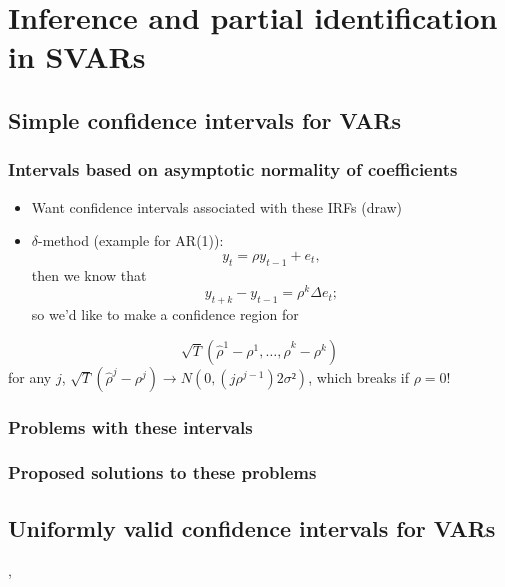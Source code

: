 

\section{Inference and partial identification in SVARs}

\subsection{Simple confidence intervals for VARs}
\subsubsection{Intervals based on asymptotic normality of coefficients}
\begin{itemize}
\item Want confidence intervals associated with these IRFs (draw)
\item $\delta$-method (example for AR(1)):
  \[y_t = \rho y_{t-1} + e_t,\]
  then we know that
  \[  y_{t+k} - y_{t-1} = \rho^k \Delta e_t;\]
  so we'd like to make a confidence region for
\end{itemize}
\[\sqrt{T} (\hat \rho^1 - \rho^1,\dots,\hat \rho^k - \rho^k)\]
for any $j$, $\sqrt{T} (\hat \rho^j - \rho^j) \to N(0, (j \rho^{j-1}) 2 \sigma²)$,
which breaks if $\rho = 0$!

\subsubsection{Problems with these intervals}
\subsubsection{Proposed solutions to these problems}
\subsection{Uniformly valid confidence intervals for VARs}
  \citep{Mik07}, \citep{Mik12}
